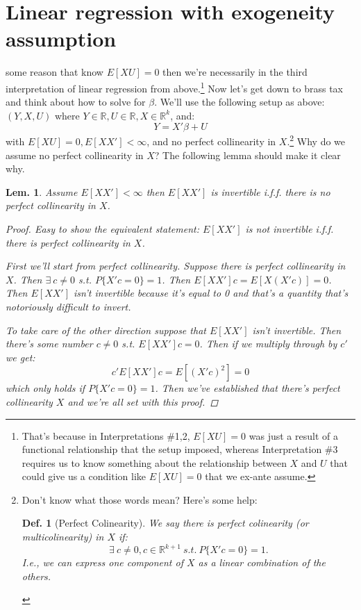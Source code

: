 \documentclass{tufte-book}
\theoremstyle{mytheoremstyle}
\theoremstyle{mylemstyle}
\newtheorem*{lem}{Lem.}
\theoremstyle{mydefstyle}
\newtheorem*{mydef}{Def.}
\begin{document}
\section{Linear regression with exogeneity assumption}
 some reason that know \(E[XU] = 0\) then we're necessarily in the third interpretation of linear regression from above.\footnote{That's because in Interpretations \#1,2, \(E[XU] = 0\) was just a result of a functional relationship that the setup imposed, whereas Interpretation \#3 requires us to know something about the relationship between \(X\) and \(U\) that could give us a condition like \(E[XU] = 0\) that we ex-ante assume.} Now let's get down to brass tax and think about how to solve for \(\beta\). We'll use the following setup as above: \((Y, X, U)\) where \(Y \in \mathbb{R}, U \in \mathbb{R}, X \in \mathbb{R}^k\), and:
	\[Y = X'\beta + U\]
with \(E[XU] = 0, E[XX'] < \infty\), and no perfect collinearity in \(X\).\footnote{Don't know what those words mean? Here's some help: \begin{mydef}[Perfect Colinearity] We say there is perfect colinearity (or multicolinearity) in \(X\) if:	
	\[\exists\ c \ne 0, c \in \mathbb{R}^{k+1}\ s.t.\ P\{X'c = 0\} = 1 \text{.}\] 
I.e., we can express one component of \(X\) as a linear combination of the others. \end{mydef}} Why do we assume no perfect collinearity in \(X\)? The following lemma should make it clear why.

\begin{lem} Assume \(E[XX'] < \infty\) then \(E[XX']\) is invertible i.f.f. there is no perfect collinearity in \(X\).
	\begin{proof} Easy to show the equivalent statement: \(E[XX']\) is not invertible i.f.f. there is perfect collinearity in \(X\). 
	
	First we'll start from perfect collinearity. Suppose there is perfect collinearity in \(X\). Then \(\exists\ c\ne 0\) s.t. \(P\{X'c=0\} = 1\). Then \(E[XX']c = E[X(X'c)] = 0\). Then \(E[XX']\) isn't invertible because it's equal to 0 and that's a quantity that's notoriously difficult to invert. 
	
	To take care of the other direction suppose that \(E[XX']\) isn't invertible. Then there's some number \(c \ne 0\) s.t. \(E[XX']c = 0\). Then if we multiply through by \(c'\) we get:
		\[c'E[XX']c = E[(X'c)^2] = 0\]
	which only holds if \(P\{X'c = 0\} = 1\). Then we've established that there's perfect collinearity \(X\) and we're all set with this proof.
	\end{proof}
\end{lem}
\end{document}
